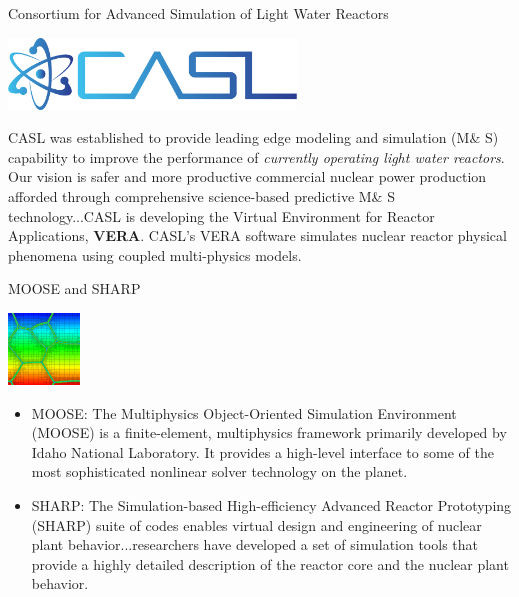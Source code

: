 \documentclass[xcolor=x11names,compress]{beamer}
\renewcommand{\(}{\begin{columns}}
\renewcommand{\)}{\end{columns}}
\newcommand{\<}[1]{\begin{column}{#1}}
\renewcommand{\>}{\end{column}}
\begin{document}
\begin{frame}{Consortium for Advanced Simulation of Light Water Reactors}
\begin{center}
\includegraphics[height=0.75in,clip]{../figs/CASL}
\end{center}
CASL was established to provide leading edge modeling and simulation (M\& S) capability to improve the performance of \textit{currently operating light water reactors}. Our vision is safer and more productive commercial nuclear power production afforded through comprehensive science-based predictive M\& S technology...CASL is developing the Virtual Environment for Reactor Applications, \textbf{VERA}. CASL's VERA software simulates nuclear reactor physical phenomena using coupled multi-physics models. 
\end{frame}


\begin{frame}{MOOSE and SHARP}
\begin{center}
\includegraphics[height=0.75in,clip]{../figs/moose}
\end{center}
\begin{itemize}
\item \textcolor{RawSienna}{MOOSE}: The Multiphysics Object-Oriented Simulation Environment (MOOSE) is a finite-element, multiphysics framework primarily developed by Idaho National Laboratory. It provides a high-level interface to some of the most sophisticated nonlinear solver technology on the planet.
\item \textcolor{RawSienna}{SHARP}: The Simulation-based High-efficiency Advanced Reactor Prototyping (SHARP) suite of codes enables virtual design and engineering of nuclear plant behavior...researchers have developed a set of simulation tools that provide a highly detailed description of the reactor core and the nuclear plant behavior. 
\end{itemize}
\end{frame}
\end{document}
